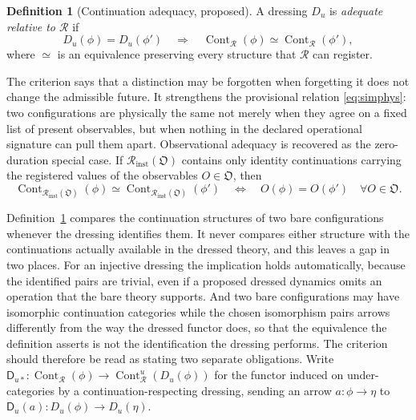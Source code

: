 \documentclass[11pt]{article}
\theoremstyle{plain}
\theoremstyle{definition}
\newtheorem{definition}{Definition}
\theoremstyle{remark}
\newcommand{\R}{\mathcal R}
\newcommand{\Cont}{\operatorname{Cont}}
\begin{document}
\begin{definition}[Continuation adequacy, proposed]\label{def:adequacy}
A dressing $D_u$ is \emph{adequate relative to $\R$} if
\begin{equation}\label{eq:adequacy}
D_u(\phi)=D_u(\phi')\quad\Longrightarrow\quad \Cont_\R(\phi)\simeq\Cont_\R(\phi'),
\end{equation}
where $\simeq$ is an equivalence preserving every structure that $\R$ can register.
\end{definition}

The criterion says that a distinction may be forgotten when forgetting it does not change the admissible future. It strengthens the provisional relation \eqref{eq:simphys}: two configurations are physically the same not merely when they agree on a fixed list of present observables, but when nothing in the declared operational signature can pull them apart. Observational adequacy is recovered as the zero-duration special case. If $\R_{\mathrm{inst}}(\mathfrak O)$ contains only identity continuations carrying the registered values of the observables $O\in\mathfrak O$, then
\begin{equation}\label{eq:instobs}
\Cont_{\R_{\mathrm{inst}}(\mathfrak O)}(\phi)\simeq
\Cont_{\R_{\mathrm{inst}}(\mathfrak O)}(\phi')
\quad\Longleftrightarrow\quad
O(\phi)=O(\phi')\quad\forall O\in\mathfrak O.
\end{equation}

Definition~\ref{def:adequacy} compares the continuation structures of two bare configurations whenever the dressing identifies them. It never compares either structure with the continuations actually available in the dressed theory, and this leaves a gap in two places. For an injective dressing the implication holds automatically, because the identified pairs are trivial, even if a proposed dressed dynamics omits an operation that the bare theory supports. And two bare configurations may have isomorphic continuation categories while the chosen isomorphism pairs arrows differently from the way the dressed functor does, so that the equivalence the definition asserts is not the identification the dressing performs. The criterion should therefore be read as stating two separate obligations. Write $\mathsf D_{u*}:\Cont_\R(\phi)\to\Cont^{u}_{\R}(D_u(\phi))$ for the functor induced on under-categories by a continuation-respecting dressing, sending an arrow $a:\phi\to\eta$ to $\mathsf D_u(a):D_u(\phi)\to D_u(\eta)$.
\end{document}
